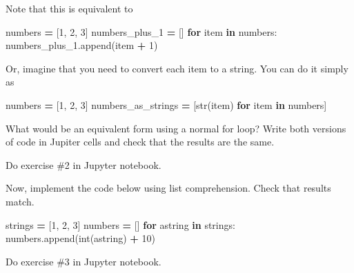 \documentclass[
]{book}
\newenvironment{Shaded}{\begin{snugshade}}{\end{snugshade}}
\newcommand{\BuiltInTok}[1]{#1}
\newcommand{\ControlFlowTok}[1]{\textcolor[rgb]{0.13,0.29,0.53}{\textbf{#1}}}
\newcommand{\DecValTok}[1]{\textcolor[rgb]{0.00,0.00,0.81}{#1}}
\newcommand{\KeywordTok}[1]{\textcolor[rgb]{0.13,0.29,0.53}{\textbf{#1}}}
\newcommand{\NormalTok}[1]{#1}
\newcommand{\OperatorTok}[1]{\textcolor[rgb]{0.81,0.36,0.00}{\textbf{#1}}}
\newcommand{\StringTok}[1]{\textcolor[rgb]{0.31,0.60,0.02}{#1}}
\begin{document}
Note that this is equivalent to

\begin{Shaded}
\begin{Highlighting}[]
\NormalTok{numbers }\OperatorTok{=}\NormalTok{ [}\DecValTok{1}\NormalTok{, }\DecValTok{2}\NormalTok{, }\DecValTok{3}\NormalTok{]}
\NormalTok{numbers\_plus\_1 }\OperatorTok{=}\NormalTok{ []}
\ControlFlowTok{for}\NormalTok{ item }\KeywordTok{in}\NormalTok{ numbers:}
\NormalTok{    numbers\_plus\_1.append(item }\OperatorTok{+} \DecValTok{1}\NormalTok{)}
\end{Highlighting}
\end{Shaded}

Or, imagine that you need to convert each item to a string. You can do it simply as

\begin{Shaded}
\begin{Highlighting}[]
\NormalTok{numbers }\OperatorTok{=}\NormalTok{ [}\DecValTok{1}\NormalTok{, }\DecValTok{2}\NormalTok{, }\DecValTok{3}\NormalTok{]}
\NormalTok{numbers\_as\_strings }\OperatorTok{=}\NormalTok{ [}\BuiltInTok{str}\NormalTok{(item) }\ControlFlowTok{for}\NormalTok{ item }\KeywordTok{in}\NormalTok{ numbers]}
\end{Highlighting}
\end{Shaded}

What would be an equivalent form using a normal for loop? Write both versions of code in Jupiter cells and check that the results are the same.

Do exercise \#2 in Jupyter notebook.

Now, implement the code below using list comprehension. Check that results match.

\begin{Shaded}
\begin{Highlighting}[]
\NormalTok{strings }\OperatorTok{=}\NormalTok{ [}\StringTok{\textquotesingle{}1\textquotesingle{}}\NormalTok{, }\StringTok{\textquotesingle{}2\textquotesingle{}}\NormalTok{, }\StringTok{\textquotesingle{}3\textquotesingle{}}\NormalTok{]}
\NormalTok{numbers }\OperatorTok{=}\NormalTok{ []}
\ControlFlowTok{for}\NormalTok{ astring }\KeywordTok{in}\NormalTok{ strings:}
\NormalTok{    numbers.append(}\BuiltInTok{int}\NormalTok{(astring) }\OperatorTok{+} \DecValTok{10}\NormalTok{)}
\end{Highlighting}
\end{Shaded}

Do exercise \#3 in Jupyter notebook.
\end{document}
